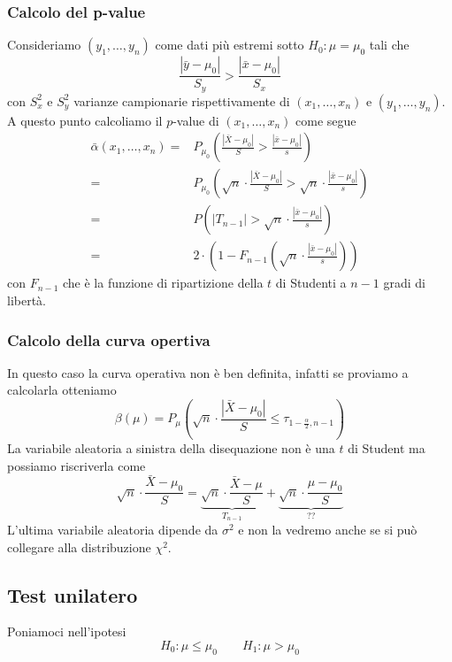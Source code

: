 \subsubsection{Calcolo del p-value}
Consideriamo $(y_1, \dots, y_n)$ come dati più estremi sotto $H_0 : \mu = \mu_0$ tali che
\[ \frac{|\bar{y} - \mu_0|}{S_y} > \frac{|\bar{x} - \mu_0|}{S_x} \]
con $S_x^2$ e $S_y^2$ varianze campionarie rispettivamente di $(x_1, \dots, x_n)$ e
$(y_1, \dots, y_n)$. A questo punto calcoliamo il $p$-value di $(x_1, \dots, x_n)$ come segue
\begin{align*}
	\bar{\alpha}(x_1, \dots, x_n) = & P_{\mu_0} \left( \frac{|\bar{X} - \mu_0|}{S} >
	\frac{|\bar{x} - \mu_0|}{s} \right)                                                \\
	=                               & P_{\mu_0} \left( \sqrt{n} \cdot
	\frac{|\bar{X} - \mu_0|}{S} > \sqrt{n} \cdot \frac{|\bar{x} - \mu_0|}{s} \right)   \\
	=                               & P \left( |T_{n-1}| >
	\sqrt{n} \cdot \frac{|\bar{x} - \mu_0|}{s} \right)                                 \\
	=                               & 2 \cdot \left( 1 - F_{n-1} \left( \sqrt{n} \cdot
	\frac{|\bar{x} - \mu_0|}{s} \right) \right)
\end{align*}
con $F_{n-1}$ che è la funzione di ripartizione della $t$ di Studenti a $n-1$ gradi di libertà.

\subsubsection{Calcolo della curva opertiva}
In questo caso la curva operativa non è ben definita, infatti se proviamo a calcolarla otteniamo
\[
	\beta (\mu) = P_\mu \left( \sqrt{n} \cdot \frac{|\bar{X} - \mu_0|}{S}
	\leq \tau_{1 - \frac{\alpha}{2}, n-1} \right)
\]
La variabile aleatoria a sinistra della disequazione non è una $t$ di Student ma possiamo
riscriverla come
\[
	\sqrt{n}  \cdot \frac{\bar{X} - \mu_0}{S} =
	\underbrace{\sqrt{n} \cdot \frac{\bar{X} - \mu}{S}}_{T_{n-1}} +
	\underbrace{\sqrt{n}  \cdot \frac{\mu - \mu_0}{S}}_{??}
\]
L'ultima variabile aleatoria dipende da $\sigma^2$ e non la vedremo anche se si può collegare alla
distribuzione $\chi^2$.

\subsection{Test unilatero}
Poniamoci nell'ipotesi
\[ H_0 : \mu \leq \mu_0 \qquad H_1 : \mu > \mu_0 \]

